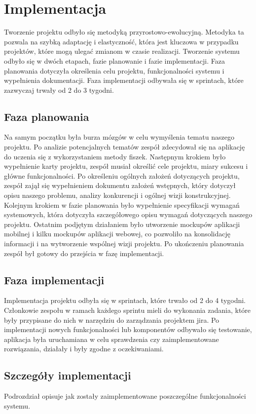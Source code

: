 \chapter{Implementacja}

Tworzenie projektu odbyło się metodyką przyrostowo-ewolucyjną. Metodyka ta pozwala na szybką adaptację i elastyczność, która jest kluczowa w przypadku projektów, które mogą ulegać zmianom w czasie realizacji. Tworzenie systemu odbyło się w dwóch etapach, fazie planowanie i fazie implementacji. Faza planowania dotyczyła określenia celu projektu, funkcjonalności systemu i wypełnienia dokumentacji. Faza implementacji odbywała się w sprintach, które zazwyczaj trwały od 2 do 3 tygodni.

\section{Faza planowania}

Na samym początku była burza mózgów w celu wymyślenia tematu naszego projektu. Po analizie potencjalnych tematów zespół zdecydował się na aplikację do uczenia się z wykorzystaniem metody fiszek. Następnym krokiem było wypełnienie karty projektu, zespół musiał określić cele projektu, miary sukcesu i główne funkcjonalności. Po określeniu ogólnych założeń dotyczących projektu, zespół zajął się wypełnieniem dokumentu założeń wstępnych, który dotyczył opisu naszego problemu, analizy konkurencji i ogólnej wizji konstrukcyjnej. Kolejnym krokiem w fazie planowania było wypełnienie specyfikacji wymagań systemowych, która dotyczyła szczegółowego opisu wymagań dotyczących naszego projektu. Ostatnim podjętym działaniem było utworzenie mockupów aplikacji mobilnej i kilku mockupów aplikacji webowej, co pozwoliło na konsolidację informacji i na wytworzenie wspólnej wizji projektu. Po ukończeniu planowania zespół był gotowy do przejścia w fazę implementacji.

\section{Faza implementacji}

Implementacja projektu odbyła się w sprintach, które trwało od 2 do 4 tygodni. Członkowie zespołu w ramach każdego sprintu mieli do wykonania zadania, które były przypisane do nich w narzędziu do zarządzania projektem jira. Po implementacji nowych funkcjonalności lub komponentów odbywało się testowanie, aplikacja była uruchamiana w celu sprawdzenia czy zaimplementowane rozwiązania, działały i były zgodne z oczekiwaniami. 



\section{Szczegóły implementacji}

Podrozdział opisuje jak zostały zaimplementowane poszczególne funkcjonalności systemu.















